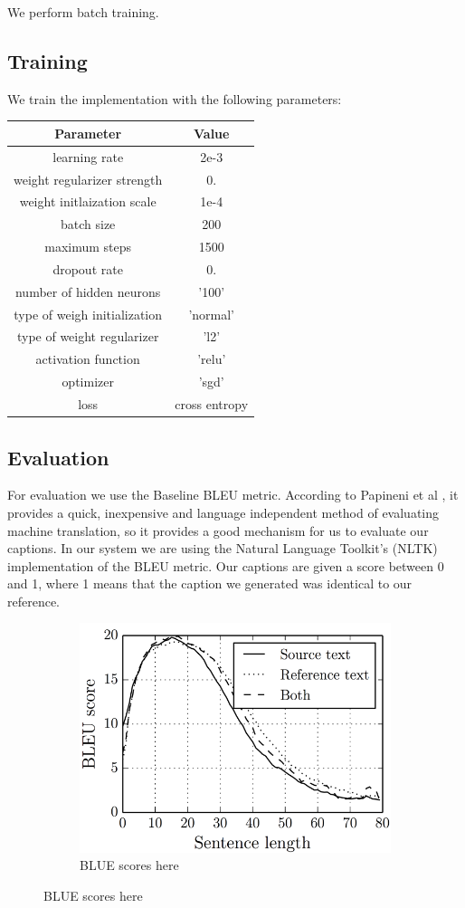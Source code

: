 \documentclass{article}
\begin{document}
We perform batch training. 

\subsection{Training}

We train the implementation with the following parameters: 

\begin{tabular}{|c|c|}
\hline
\textbf{Parameter} & \textbf{Value}\\ \hline \hline
learning rate & 2e-3 \\ \hline
weight regularizer strength & 0. \\ \hline
weight initlaization scale & 1e-4 \\ \hline
batch size & 200 \\ \hline
maximum steps & 1500 \\ \hline
dropout rate & 0. \\ \hline
number of hidden neurons & '100' \\ \hline
type of weigh initialization & 'normal' \\ \hline
type of weight regularizer & 'l2' \\ \hline
activation function & 'relu' \\ \hline
optimizer & 'sgd' \\ \hline
loss & cross entropy \\ \hline
\end{tabular}

\subsection{Evaluation}
For evaluation we use the Baseline BLEU metric. According to Papineni et al \cite{papineni2002bleu}, it provides a quick, inexpensive and language independent method of evaluating machine translation, so it provides a good mechanism for us to evaluate our captions. In our system we are using the Natural Language Toolkit's (NLTK) implementation of the BLEU metric. Our captions are given a score between 0 and 1, where 1 means that the caption we generated was identical to our reference.

\begin{figure}[H]
	\centering
	\begin{subfigure}{\textwidth}
		\centering
		\includegraphics[width=0.3\linewidth]{./images/phony-bleu.png}
		\caption{BLUE scores here}
	\end{subfigure}
\end{figure}
\end{document}
